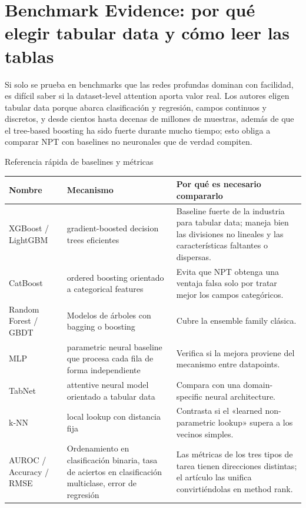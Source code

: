 \section{Benchmark Evidence: por qué elegir tabular data y cómo leer las tablas}

Si solo se prueba en benchmarks que las redes profundas dominan con facilidad, es difícil saber si la dataset-level attention aporta valor real. Los autores eligen tabular data porque abarca clasificación y regresión, campos continuos y discretos, y desde cientos hasta decenas de millones de muestras, además de que el tree-based boosting ha sido fuerte durante mucho tiempo; esto obliga a comparar NPT con baselines no neuronales que de verdad compiten.


\begin{knowledgebox}{Referencia rápida de baselines y métricas}
\begin{tabularx}{\textwidth}{L{0.19\textwidth}L{0.25\textwidth}>{\raggedright\arraybackslash}X}
\toprule
Nombre & Mecanismo & Por qué es necesario compararlo \\
\midrule
XGBoost / LightGBM & gradient-boosted decision trees eficientes & Baseline fuerte de la industria para tabular data; maneja bien las divisiones no lineales y las características faltantes o dispersas. \\
CatBoost & ordered boosting orientado a categorical features & Evita que NPT obtenga una ventaja falsa solo por tratar mejor los campos categóricos. \\
Random Forest / GBDT & Modelos de árboles con bagging o boosting & Cubre la ensemble family clásica. \\
MLP & parametric neural baseline que procesa cada fila de forma independiente & Verifica si la mejora proviene del mecanismo entre datapoints. \\
TabNet & attentive neural model orientado a tabular data & Compara con una domain-specific neural architecture. \\
k-NN & local lookup con distancia fija & Contrasta si el «learned non-parametric lookup» supera a los vecinos simples. \\
AUROC / Accuracy / RMSE & Ordenamiento en clasificación binaria, tasa de aciertos en clasificación multiclase, error de regresión & Las métricas de los tres tipos de tarea tienen direcciones distintas; el artículo las unifica convirtiéndolas en method rank. \\
\bottomrule
\end{tabularx}
\end{knowledgebox}

